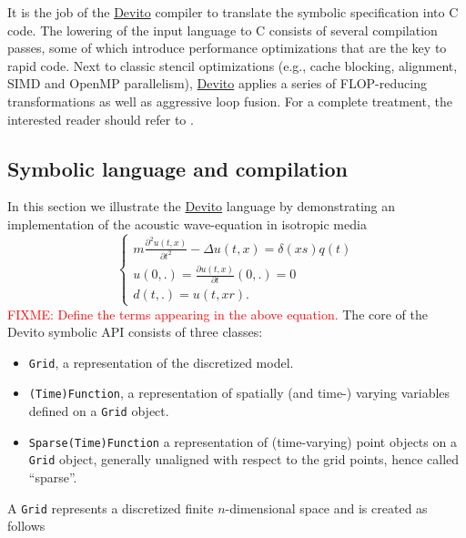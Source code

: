 \documentclass[10pt, conference]{IEEEtran}
\newcommand{\devito}{\href{https://github.com/devitocodes/devito}{Devito} }
\begin{document}
It is the job of the \devito compiler to translate the symbolic specification
into C code. The lowering of the input language to C consists of
several compilation passes, some of which introduce performance
optimizations that are the key to rapid code. Next to classic stencil
optimizations (e.g., cache blocking, alignment, SIMD and OpenMP
parallelism), \devito applies a series of FLOP-reducing transformations as
well as aggressive loop fusion. For a complete treatment, the interested
reader should refer to \cite{devito-compiler}.

\subsection{Symbolic language and
compilation}\label{symbolic-language-and-compilation}

In this section we illustrate the \devito language by demonstrating
an implementation of the acoustic wave-equation in isotropic media
%
\begin{equation}
\begin{cases}
 m \frac{\partial^2 u(t, x)}{\partial t^2} - \Delta u(t, x) = \delta(xs) q(t) \\
 u(0, .) = \frac{\partial u(t, x)}{\partial t}(0, .) = 0 \\
 d(t, .) = u(t, xr).
 \end{cases}
\label{acou}
\end{equation}
%
\textcolor{red}{FIXME: Define the terms appearing in the above equation.}
 The core of the Devito
symbolic API consists of three classes:

\begin{itemize}
\itemsep1pt\parskip0pt
\item
  \texttt{Grid}, a representation of the discretized model.
\item
  \texttt{(Time)Function}, a representation of spatially (and time-)
  varying variables defined on a \texttt{Grid} object.
\item
  \texttt{Sparse(Time)Function} a representation of (time-varying) point
  objects on a \texttt{Grid} object, generally unaligned with respect to
  the grid points, hence called ``sparse''.
\end{itemize}

A \texttt{Grid} represents a discretized finite $n$-dimensional space and
is created as follows
\end{document}
